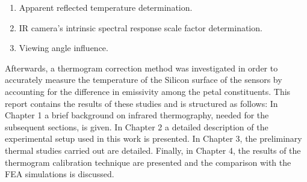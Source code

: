 	\begin{enumerate}
		\item Apparent reflected temperature determination.
		\item IR camera’s intrinsic spectral response scale factor determination.
		\item Viewing angle influence.
	\end{enumerate}
	
	Afterwards, a thermogram correction method was investigated in order to accurately measure the temperature of the Silicon surface of the sensors by accounting for the difference in emissivity among the petal constituents.
	This report contains the results of these studies and is structured as follows: In Chapter 1 a brief background on infrared thermography, needed for the subsequent sections, is given. In Chapter 2 a detailed description of the experimental setup used in this work is presented. In Chapter 3, the preliminary thermal studies carried out are detailed. Finally, in Chapter 4, the results of the thermogram calibration technique are presented and the comparison with the FEA simulations is discussed. 